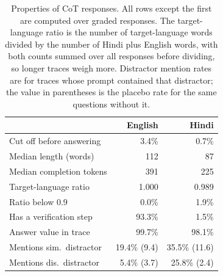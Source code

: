 \begin{table}[t]
\centering
\small
\setlength{\tabcolsep}{4pt}
\begin{tabular}{lrr}
\toprule
 & English & Hindi \\
\midrule
Cut off before answering & 3.4\% & 0.7\% \\
Median length (words) & 112 & 87 \\
Median completion tokens & 391 & 225 \\
Target-language ratio & 1.000 & 0.989 \\
Ratio below 0.9 & 0.0\% & 1.9\% \\
Has a verification step & 93.3\% & 1.5\% \\
Answer value in trace & 99.7\% & 98.1\% \\
Mentions sim.\ distractor & 19.4\% (9.4) & 35.5\% (11.6) \\
Mentions dis.\ distractor & 5.4\% (3.7) & 25.8\% (2.4) \\
\bottomrule
\end{tabular}
\caption{Properties of CoT responses. All rows except the first are computed over graded responses. The target-language ratio is the number of target-language words divided by the number of Hindi plus English words, with both counts summed over all responses before dividing, so longer traces weigh more. Distractor mention rates are for traces whose prompt contained that distractor; the value in parentheses is the placebo rate for the same questions without it.}
\label{tab:trace}
\end{table}
